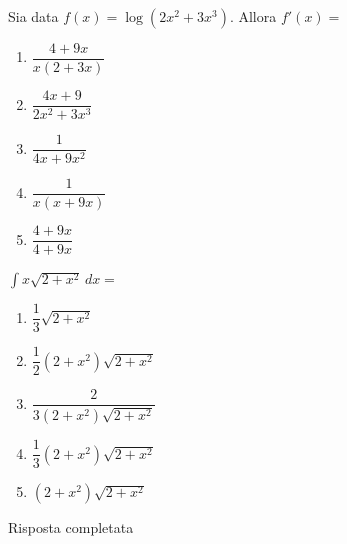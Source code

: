\begin{quiz}
Sia data $f(x)=\log(2x^2+3x^3)$. Allora $f'(x)=$
\begin{enumerate}
\item $\dfrac{4+9x}{x(2+3x)}$
\item $\dfrac{4x+9}{2x^2+3x^3}$
\item $\dfrac1{4x+9x^2}$
\item $\dfrac1{x(x+9x)}$
\item $\dfrac{4+9x}{4+9x}$
\end{enumerate}
\end{quiz}

\begin{quiz}
$\displaystyle\int x\sqrt{2+x^2}\,dx=$
\begin{enumerate}
\item $\dfrac13\sqrt{2+x^2}$
\item $\dfrac12(2+x^2)\sqrt{2+x^2}$
\item $\dfrac2{3(2+x^2)\sqrt{2+x^2}}$
\item $\dfrac13(2+x^2)\sqrt{2+x^2}$
\item $(2+x^2)\sqrt{2+x^2}$
\end{enumerate}
\end{quiz}
Risposta completata
